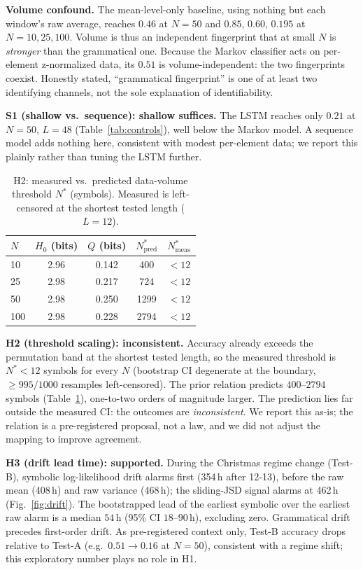 \documentclass[conference]{IEEEtran}
\begin{document}
\textbf{Volume confound.} The mean-level-only baseline, using nothing but each
window's raw average, reaches $0.46$ at $N{=}50$ and $0.85$, $0.60$, $0.195$ at
$N{=}10,25,100$. Volume is thus an independent fingerprint that at small $N$ is
\emph{stronger} than the grammatical one. Because the Markov classifier acts on
per-element z-normalized data, its $0.51$ is volume-independent: the two
fingerprints coexist. Honestly stated, ``grammatical fingerprint'' is one of at
least two identifying channels, not the sole explanation of identifiability.

\textbf{S1 (shallow vs.\ sequence): shallow suffices.} The LSTM reaches only
$0.21$ at $N{=}50$, $L{=}48$ (Table~\ref{tab:controls}), well below the Markov
model. A sequence model adds nothing here, consistent with modest per-element
data; we report this plainly rather than tuning the LSTM further.

\begin{table}[t]
\caption{H2: measured vs.\ predicted data-volume threshold $N^\ast$ (symbols).
Measured is left-censored at the shortest tested length ($L{=}12$).}
\label{tab:h2}
\centering\small
\begin{tabular}{lcccc}
\toprule
$N$ & $H_0$ (bits) & $Q$ (bits) & $N^\ast_{\text{pred}}$ & $N^\ast_{\text{meas}}$\\
\midrule
10 & 2.96 & 0.142 & 400 & $<12$\\
25 & 2.98 & 0.217 & 724 & $<12$\\
50 & 2.98 & 0.250 & 1299 & $<12$\\
100 & 2.98 & 0.228 & 2794 & $<12$\\
\bottomrule
\end{tabular}
\end{table}

\textbf{H2 (threshold scaling): inconsistent.} Accuracy already exceeds the
permutation band at the shortest tested length, so the measured threshold is
$N^\ast<12$ symbols for every $N$ (bootstrap CI degenerate at the boundary,
$\ge995/1000$ resamples left-censored). The prior relation predicts
$400$--$2794$ symbols (Table~\ref{tab:h2}), one-to-two orders of magnitude
larger. The prediction lies far outside the measured CI: the outcomes are
\emph{inconsistent}. We report this as-is; the relation is a pre-registered
proposal, not a law, and we did not adjust the mapping to improve agreement.

\textbf{H3 (drift lead time): supported.} During the Christmas regime change
(Test-B), symbolic log-likelihood drift alarms first (354\,h after 12-13),
before the raw mean (408\,h) and raw variance (468\,h); the sliding-JSD signal
alarms at 462\,h (Fig.~\ref{fig:drift}). The bootstrapped lead of the earliest
symbolic over the earliest raw alarm is a median $54$\,h (95\% CI
$18$--$90$\,h), excluding zero. Grammatical drift precedes first-order drift.
As pre-registered context only, Test-B accuracy drops relative to Test-A (e.g.\
$0.51\!\to\!0.16$ at $N{=}50$), consistent with a regime shift; this
exploratory number plays no role in H1.
\end{document}
